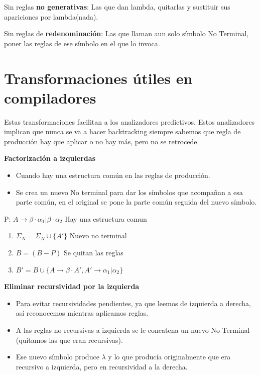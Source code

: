 \documentclass[12pt, twoside, openright]{report} %
\begin{document}
Sin reglas \textbf{no generativas}: Las que dan lambda, quitarlas y
sustituir sus apariciones por lambda(nada).

Sin reglas de \textbf{redenominación}: Las que llaman aun solo símbolo
No Terminal, poner las reglas de ese símbolo en el que lo invoca.


\section{Transformaciones útiles en compiladores}

Estas transformaciones facilitan a los analizadores predictivos. Estos
analizadores implican que nunca se va a hacer backtracking siempre
sabemos que regla de producción hay que aplicar o no hay más, pero no se
retrocede.

\textbf{Factorización a izquierdas}

\begin{itemize}
\item
  Cuando hay una estructura común en las reglas de producción.
\item
  Se crea un nuevo No terminal para dar los símbolos que acompañan a esa
  parte común, en el original se pone la parte común seguida del nuevo
  símbolo.
\end{itemize}

P: $A \rightarrow \beta \cdot \alpha_1 | \beta \cdot \alpha_2$ Hay una estructura comun

\begin{enumerate}
  \item $\Sigma_N = \Sigma_N \cup \{ A'\}$ Nuevo no terminal
  \item $B = (B - P)$ Se quitan las reglas
  \item $B' = B \cup \{ A \rightarrow \beta \cdot A',{ } A' \rightarrow \alpha_1 | \alpha_2 \}$
\end{enumerate}

\textbf{Eliminar recursividad por la izquierda}

\begin{itemize}
\item
  Para evitar recursividades pendientes, ya que leemos de izquierda a
  derecha, así reconocemos mientras aplicamos reglas.
\item
  A las reglas no recursivas a izquierda se le concatena un nuevo No
  Terminal (quitamos las que eran recursivas).
\item
  Ese nuevo símbolo produce \(\lambda\) y lo que producía originalmente
  que era recursivo a izquierda, pero en recursividad a la derecha.
\end{itemize}
\end{document}
